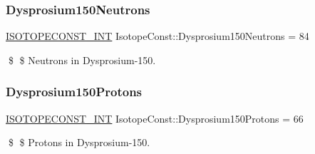 \subsubsection{\texorpdfstring{Dysprosium150\+Neutrons}{Dysprosium150Neutrons}}
{\footnotesize\ttfamily \mbox{\hyperlink{group___isotope_const-_macros_ga5f18360b3e99483a35c32d789e62621c}{I\+S\+O\+T\+O\+P\+E\+C\+O\+N\+S\+T\+\_\+\+I\+NT}} Isotope\+Const\+::\+Dysprosium150\+Neutrons = 84}

\$ \$ Neutrons in Dysprosium-\/150. \mbox{\label{group___isotope_const-_dysprosium-_dy150_gab1b06d40345e971525e715dd18fa7468}} 
\subsubsection{\texorpdfstring{Dysprosium150\+Protons}{Dysprosium150Protons}}
{\footnotesize\ttfamily \mbox{\hyperlink{group___isotope_const-_macros_ga5f18360b3e99483a35c32d789e62621c}{I\+S\+O\+T\+O\+P\+E\+C\+O\+N\+S\+T\+\_\+\+I\+NT}} Isotope\+Const\+::\+Dysprosium150\+Protons = 66}

\$ \$ Protons in Dysprosium-\/150. 